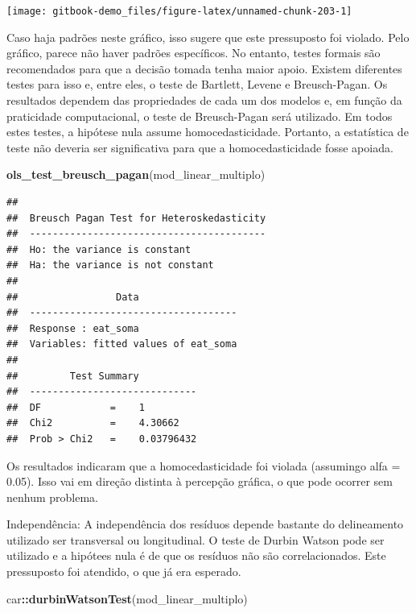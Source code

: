 \documentclass[
]{book}
\newenvironment{Shaded}{\begin{snugshade}}{\end{snugshade}}
\newcommand{\KeywordTok}[1]{\textcolor[rgb]{0.13,0.29,0.53}{\textbf{#1}}}
\newcommand{\NormalTok}[1]{#1}
\newcommand{\OperatorTok}[1]{\textcolor[rgb]{0.81,0.36,0.00}{\textbf{#1}}}
\begin{document}
\begin{center}\texttt{[image: gitbook-demo\_files/figure-latex/unnamed-chunk-203-1]} \end{center}

Caso haja padrões neste gráfico, isso sugere que este pressuposto foi
violado. Pelo gráfico, parece não haver padrões específicos. No entanto,
testes formais são recomendados para que a decisão tomada tenha maior
apoio. Existem diferentes testes para isso e, entre eles, o teste de
Bartlett, Levene e Breusch-Pagan. Os resultados dependem das
propriedades de cada um dos modelos e, em função da praticidade
computacional, o teste de Breusch-Pagan será utilizado. Em todos estes
testes, a hipótese nula assume homocedasticidade. Portanto, a
estatística de teste não deveria ser significativa para que a
homocedasticidade fosse apoiada.

\begin{Shaded}
\begin{Highlighting}[]
\KeywordTok{ols_test_breusch_pagan}\NormalTok{(mod_linear_multiplo)}
\end{Highlighting}
\end{Shaded}

\begin{verbatim}
## 
##  Breusch Pagan Test for Heteroskedasticity
##  -----------------------------------------
##  Ho: the variance is constant            
##  Ha: the variance is not constant        
## 
##                 Data                 
##  ------------------------------------
##  Response : eat_soma 
##  Variables: fitted values of eat_soma 
## 
##         Test Summary          
##  -----------------------------
##  DF            =    1 
##  Chi2          =    4.30662 
##  Prob > Chi2   =    0.03796432
\end{verbatim}

Os resultados indicaram que a homocedasticidade foi violada (assumingo
alfa = 0.05). Isso vai em direção distinta à percepção gráfica, o que
pode ocorrer sem nenhum problema.

Independência: A independência dos resíduos depende bastante do
delineamento utilizado ser transversal ou longitudinal. O teste de
Durbin Watson pode ser utilizado e a hipótees nula é de que os resíduos
não são correlacionados. Este pressuposto foi atendido, o que já era
esperado.

\begin{Shaded}
\begin{Highlighting}[]
\NormalTok{car}\OperatorTok{::}\KeywordTok{durbinWatsonTest}\NormalTok{(mod_linear_multiplo)}
\end{Highlighting}
\end{Shaded}
\end{document}
